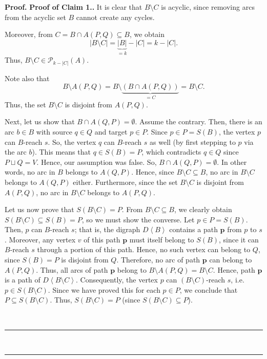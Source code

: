 \documentclass[numbers=enddot,12pt,final,onecolumn,notitlepage]{scrartcl}%
\theoremstyle{definition}
\newenvironment{proof}[1][Proof]{\noindent\textbf{#1.} }{\ \rule{0.5em}{0.5em}}
\theoremstyle{plainsl}
\begin{document}
\begin{proof}
\begin{proof}[Proof of Claim 1.]
    It is clear that $B \setminus C$ is acyclic, since removing arcs from the acyclic set $B$ cannot create any cycles.

    Moreover, from $C = B \cap A(P,Q) \subseteq B$, we obtain \begin{equation*}
        |B\setminus C| = \underbrace{|B|}_{=k} - |C| = k-|C|.
    \end{equation*} Thus, $B \setminus C \in \mathcal{P}_{k-|C|}(A)$.

    Note also that \begin{equation*}
        B \setminus A(P,Q) = B \setminus \underbrace{(B \cap A(P,Q))}_{=C} = B \setminus C.
    \end{equation*} Thus, the set $B \setminus C$ is disjoint from $A(P,Q)$.

    Next, let us show that $B \cap A(Q,P) = \emptyset$. Assume the contrary. Then, there is an arc $b \in B$ with source $q \in Q$ and target $p \in P$. Since $p \in P = S(B)$, the vertex $p$ can $B$-reach $s$. So, the vertex $q$ can $B$-reach $s$ as well (by first stepping to $p$ via the arc $b$). This means that $q \in S(B) = P$, which contradicts $q \in Q$ since $P \sqcup Q = V$. Hence, our assumption was false. So, $B \cap A(Q,P) = \emptyset$. In other words, no arc in $B$ belongs to $A(Q,P)$. Hence, since $B \setminus C \subseteq B$, no arc in $B \setminus C$ belongs to $A(Q,P)$ either. Furthermore, since the set $B \setminus C$ is disjoint from $A(P,Q)$, no arc in $B \setminus C$ belongs to $A(P,Q)$.

    Let us now prove that $S(B \setminus C) = P$. From $B \setminus C \subseteq B$, we clearly obtain $S(B \setminus C) \subseteq S(B) = P$, so we must show the converse. Let $p \in P = S(B)$. Then, $p$ can $B$-reach $s$; that is, the digraph $D \left\langle B \right\rangle$ contains a path $\textbf{p}$ from $p$ to $s$. Moreover, any vertex $v$ of this path $\textbf{p}$ must itself belong to $S(B)$, since it can $B$-reach $s$ through a portion of this path. Hence, no such vertex can belong to $Q$, since $S(B) = P$ is disjoint from $Q$. Therefore, no arc of path $\textbf{p}$ can belong to $A(P,Q)$. Thus, all arcs of path $\textbf{p}$ belong to $B \setminus A(P,Q) = B \setminus C$. Hence, path $\textbf{p}$ is a path of $D \left\langle B\setminus C \right\rangle$. Consequently, the vertex $p$ can $(B \setminus C)$-reach $s$, i.e. $p \in S(B \setminus C)$. Since we have proved this for each $p \in P$, we conclude that $P \subseteq S(B\setminus C)$. Thus, $S(B\setminus C) = P$ (since $S(B\setminus C) \subseteq P$).


\end{proof}
\end{proof}
\end{document}
